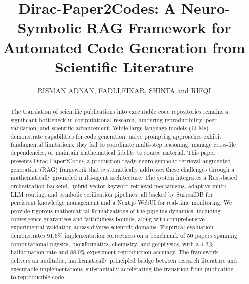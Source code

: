 \documentclass{ieeeaccess}
\begin{document}

\title{Dirac-Paper2Codes: A Neuro-Symbolic RAG Framework for Automated Code Generation from Scientific Literature}

\author{\uppercase{Risman Adnan},
\uppercase{Fadli},\uppercase{Fikar}, \uppercase{Shinta} and
\uppercase{Rifqi}}

\address[1]{Department of Computer Science, Universtias Indonesia, Jakarta, Indonesia}
\address[2]{Department of AI Engineering, Telkom University, Bandung}
\address[3]{Department of Computational Sciences, MBZ University, Dubai}




\begin{abstract}
The translation of scientific publications into executable code repositories remains a significant bottleneck in computational research, hindering reproducibility, peer validation, and scientific advancement. While large language models (LLMs) demonstrate capabilities for code generation, naive prompting approaches exhibit fundamental limitations: they fail to coordinate multi-step reasoning, manage cross-file dependencies, or maintain mathematical fidelity to source material. This paper presents Dirac-Paper2Codes, a production-ready neuro-symbolic retrieval-augmented generation (RAG) framework that systematically addresses these challenges through a mathematically grounded multi-agent architecture. The system integrates a Rust-based orchestration backend, hybrid vector-keyword retrieval mechanisms, adaptive multi-LLM routing, and symbolic verification pipelines, all backed by SurrealDB for persistent knowledge management and a Next.js WebUI for real-time monitoring. We provide rigorous mathematical formalizations of the pipeline dynamics, including convergence guarantees and faithfulness bounds, along with comprehensive experimental validation across diverse scientific domains. Empirical evaluation demonstrates 91.6\% implementation correctness on a benchmark of 50 papers spanning computational physics, bioinformatics, chemistry, and geophysics, with a 4.2\% hallucination rate and 88.0\% experiment reproduction accuracy. The framework delivers an auditable, mathematically principled bridge between research literature and executable implementations, substantially accelerating the transition from publication to reproducible code.
\end{abstract}
\end{document}
